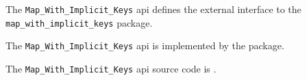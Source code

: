 The {\tt Map\_With\_Implicit\_Keys} api defines the external interface to the {\tt map\_with\_implicit\_keys} package.

The {\tt Map\_With\_Implicit\_Keys} api is implemented by the  package.

The {\tt Map\_With\_Implicit\_Keys} api source code is .



